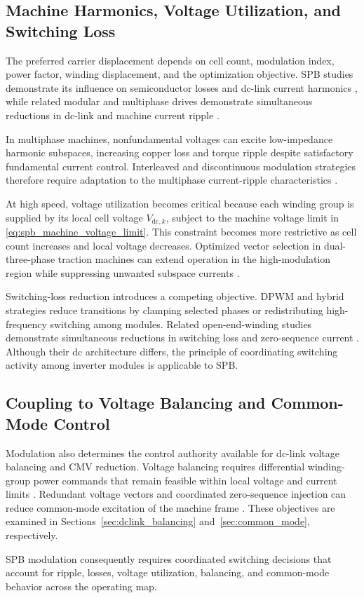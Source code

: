 \subsection{Machine Harmonics, Voltage Utilization, and Switching Loss}

The preferred carrier displacement depends on cell count, modulation
index, power factor, winding displacement, and the optimization
objective. SPB studies demonstrate its influence on semiconductor
losses and dc-link current harmonics \cite{Jin2017Modulation}, while
related modular and multiphase drives demonstrate simultaneous
reductions in dc-link and machine current ripple
\cite{Verkroost2021Ripple,DeMarcos2025InterleavedPWM,Wang2025HybridPWM}.

In multiphase machines, nonfundamental voltages can excite low-impedance
harmonic subspaces, increasing copper loss and torque ripple despite
satisfactory fundamental current control. Interleaved and discontinuous
modulation strategies therefore require adaptation to the multiphase
current-ripple characteristics
\cite{Hopkins2019DCLinkRipple,Mohamed2020DCLinkSizing,Alosa2019ModularRipple}.

At high speed, voltage utilization becomes critical because each
winding group is supplied by its local cell voltage $V_{\mathrm{dc},k}$,
subject to the machine voltage limit in
\eqref{eq:spb_machine_voltage_limit}. This constraint becomes more
restrictive as cell count increases and local voltage decreases.
Optimized vector selection in dual-three-phase traction machines can
extend operation in the high-modulation region while suppressing
unwanted subspace currents \cite{Chen2026HighModulationDTP}.

Switching-loss reduction introduces a competing objective. DPWM and
hybrid strategies reduce transitions by clamping selected phases or
redistributing high-frequency switching among modules. Related
open-end-winding studies demonstrate simultaneous reductions in
switching loss and zero-sequence current
\cite{Yang2026HybridOEW,Lee2026AlternatingDPWM}. Although their dc
architecture differs, the principle of coordinating switching activity
among inverter modules is applicable to SPB.

\subsection{Coupling to Voltage Balancing and Common-Mode Control}

Modulation also determines the control authority available for dc-link
voltage balancing and CMV reduction. Voltage balancing requires
differential winding-group power commands that remain feasible within
local voltage and current limits
\cite{Verkroost2024PowerDistribution,Wu2020ActiveBalancing,Mocevic2024GateDelay}.
Redundant voltage vectors and coordinated zero-sequence injection can
reduce common-mode excitation of the machine frame
\cite{Sun2025CMVMPC,Zheng2025MultiObjectivePWM,Chen2020EMCIntegrated}.
These objectives are examined in
Sections~\ref{sec:dclink_balancing} and~\ref{sec:common_mode}, respectively.

SPB modulation consequently requires coordinated switching decisions
that account for ripple, losses, voltage utilization, balancing, and
common-mode behavior across the operating map.
